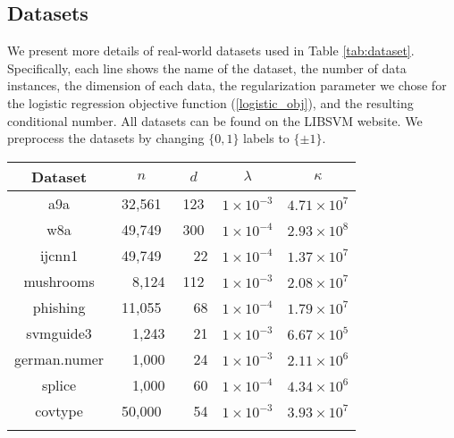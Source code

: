 \documentclass[letterpaper]{article} %
\theoremstyle{plain}
\theoremstyle{definition}
\theoremstyle{remark}
\begin{document}
\subsection{Datasets}
We present more details of real-world datasets used in Table \ref{tab:dataset}. 
Specifically, each line shows the name of the dataset, the number of data instances, the dimension of each data, the regularization parameter we chose for the logistic regression objective function (\ref{logistic_obj}), and the resulting conditional number.
All datasets can be found on the LIBSVM website.
We preprocess the datasets by changing $\{0, 1\}$ labels to $\{\pm 1\}$.
\begin{table*}[t]
\centering
\caption{Details of the real-world datasets.}
\label{tab:dataset}
\begin{tabular}{ccccc}
    \toprule
    Dataset & $n$ & $d$ & $\lambda$ & $\kappa$ \\
    \midrule
    a9a  & 32,561 & 123 &  $1 \times 10^{-3}$  &  $4.71 \times 10^{7}$ \\\addlinespace
    w8a  & 49,749 & 300 &  $1 \times 10^{-4}$  &  $2.93 \times 10^{8}$ \\\addlinespace
    ijcnn1  & 49,749 & ~~22 &  $1 \times 10^{-4}$  &  $1.37 \times 10^{7}$ \\\addlinespace
    mushrooms  & ~~8,124 & 112 &  $1 \times 10^{-3}$  &  $2.08 \times 10^{7}$ \\\addlinespace
    phishing  & 11,055 & ~~68 &  $1 \times 10^{-4}$  &  $1.79 \times 10^{7}$ \\\addlinespace
    svmguide3  & ~~1,243 & ~~21 &  $1 \times 10^{-3}$  &  $6.67 \times 10^{5}$ \\\addlinespace
    german.numer  & ~~1,000 & ~~24 &  $1 \times 10^{-3}$  &  $2.11 \times 10^{6}$ \\\addlinespace
     splice  & ~~1,000 & ~~60 &  $1 \times 10^{-4}$  &  $4.34 \times 10^{6}$ \\\addlinespace
      covtype  & 50,000 & ~~54 &  $1 \times 10^{-3}$  &  $3.93 \times 10^{7}$ \\\addlinespace
    \bottomrule
\end{tabular}
\end{table*}
\end{document}

